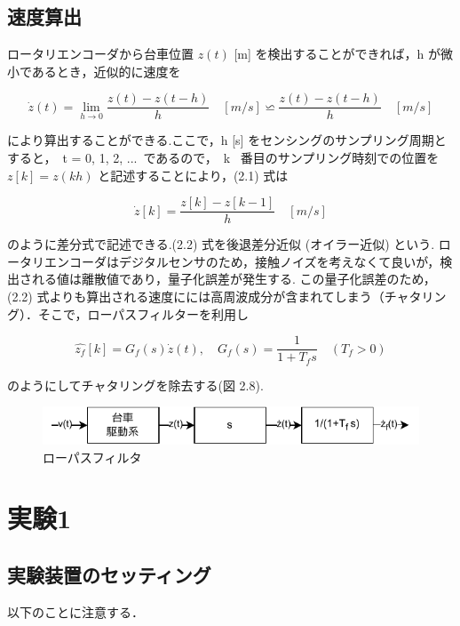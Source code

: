 \subsection{速度算出}

ロータリエンコーダから台車位置 \( z(t) \) [m] を検出することができれば，h が微小であるとき，近似的に速度を

\begin{equation}
  \dot{z}(t) = \lim_{h \to 0} \frac{z(t) - z(t-h)}{h} \quad [m/s] \backsimeq  \frac{z(t) - z(t-h)}{h} \quad [m/s]
\end{equation}

により算出することができる.ここで，h [s] をセンシングのサンプリング周期とすると，\ t = 0, 1, 2, ... \,であるので，\ k \  番目のサンプリング時刻での位置を \( z[k] = z(kh) \) と記述することにより，(2.1) 式は

\begin{equation}
  \dot{z}[k] = \frac{z[k] - z[k-1]}{h} \quad [m/s]
\end{equation}

のように差分式で記述できる.(2.2) 式を後退差分近似 (オイラー近似) という.
ロータリエンコーダはデジタルセンサのため，接触ノイズを考えなくて良いが，検出される値は離散値であり，量子化誤差が発生する.
この量子化誤差のため，(2.2) 式よりも算出される速度にには高周波成分が含まれてしまう（チャタリング）．そこで，ローパスフィルターを利用し

\begin{equation}
  \hat{z_f}[k] = G_f(s) \dot{z}(t), \quad G_f(s) = \frac{1}{1 + T_f s} \quad (T_f > 0)
\end{equation}

のようにしてチャタリングを除去する(図 2.8).

\begin{figure}[H]
  \centering
  \includegraphics[scale=1]{sozai/ro-pasufiruta.pdf}
  \caption{ローパスフィルタ}
\end{figure}

\newpage

\section{実験1}

\subsection{実験装置のセッティング}
\noindent
以下のことに注意する．

